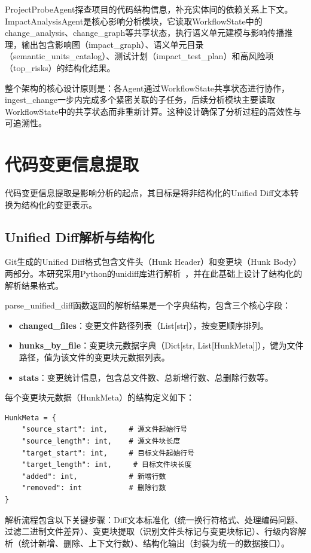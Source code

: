 ProjectProbeAgent探查项目的代码结构信息，补充实体间的依赖关系上下文。ImpactAnalysisAgent是核心影响分析模块，它读取WorkflowState中的change\_analysis、change\_graph等共享状态，执行语义单元建模与影响传播推理，输出包含影响图（impact\_graph）、语义单元目录（semantic\_units\_catalog）、测试计划（impact\_test\_plan）和高风险项（top\_risks）的结构化结果。

整个架构的核心设计原则是：各Agent通过WorkflowState共享状态进行协作，ingest\_change一步内完成多个紧密关联的子任务，后续分析模块主要读取WorkflowState中的共享状态而非重新计算。这种设计确保了分析过程的高效性与可追溯性。

\section{代码变更信息提取}
代码变更信息提取是影响分析的起点，其目标是将非结构化的Unified Diff文本转换为结构化的变更表示。

\subsection{Unified Diff解析与结构化}
Git生成的Unified Diff格式包含文件头（Hunk Header）和变更块（Hunk Body）两部分。本研究采用Python的\textsf{unidiff}库进行解析~\cite{unidiffLibrary}，并在此基础上设计了结构化的解析结果格式。

parse\_unified\_diff函数返回的解析结果是一个字典结构，包含三个核心字段：

\begin{itemize}
    \item \textbf{changed\_files}：变更文件路径列表（List[str]），按变更顺序排列。
    \item \textbf{hunks\_by\_file}：变更块元数据字典（Dict[str, List[HunkMeta]]），键为文件路径，值为该文件的变更块元数据列表。
    \item \textbf{stats}：变更统计信息，包含总文件数、总新增行数、总删除行数等。
\end{itemize}

每个变更块元数据（HunkMeta）的结构定义如下：

\begin{lstlisting}
HunkMeta = {
    "source_start": int,     # 源文件起始行号
    "source_length": int,    # 源文件块长度
    "target_start": int,     # 目标文件起始行号
    "target_length": int,     # 目标文件块长度
    "added": int,            # 新增行数
    "removed": int           # 删除行数
}
\end{lstlisting}

解析流程包含以下关键步骤：Diff文本标准化（统一换行符格式、处理编码问题、过滤二进制文件差异）、变更块提取（识别文件头标记与变更块标记）、行级内容解析（统计新增、删除、上下文行数）、结构化输出（封装为统一的数据接口）。

